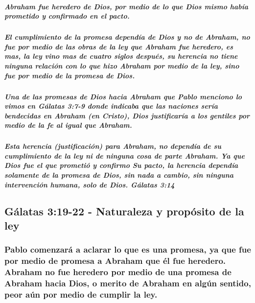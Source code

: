 \documentclass[11a pt,twoside]{article}
\let\oldsubsection\subsection
\renewcommand{\subsection}{\needspace{5\baselineskip}\oldsubsection}
\let\oldsubsubsection\subsubsection
\renewcommand{\subsubsection}{\needspace{4\baselineskip}\oldsubsubsection}
\let\oldsubparagraph\subparagraph
\renewcommand{\subparagraph}{\needspace{2\baselineskip}\oldsubparagraph}
\begin{document}
\subparagraph{Abraham fue heredero de Dios, por medio de lo que Dios
mismo había prometido y confirmado en el
pacto.}\label{abraham-fue-heredero-de-dios-por-medio-de-lo-que-dios-mismo-habuxeda-prometido-y-confirmado-en-el-pacto.}

\subparagraph{El cumplimiento de la promesa dependía de Dios y no de
Abraham, no fue por medio de las obras de la ley que Abraham fue
heredero, es mas, la ley vino mas de cuatro siglos después, su herencia
no tiene ninguna relación con lo que hizo Abraham por medio de la ley,
sino fue por medio de la promesa de
Dios.}\label{el-cumplimiento-de-la-promesa-dependuxeda-de-dios-y-no-de-abraham-no-fue-por-medio-de-las-obras-de-la-ley-que-abraham-fue-heredero-es-mas-la-ley-vino-mas-de-cuatro-siglos-despuuxe9s-su-herencia-no-tiene-ninguna-relaciuxf3n-con-lo-que-hizo-abraham-por-medio-de-la-ley-sino-fue-por-medio-de-la-promesa-de-dios.}

\subparagraph{Una de las promesas de Dios hacia Abraham que Pablo
menciono lo vimos en Gálatas 3:7-9 donde indicaba que las naciones sería
bendecidas en Abraham (en Cristo), Dios justificaría a los gentiles por
medio de la fe al igual que
Abraham.}\label{una-de-las-promesas-de-dios-hacia-abraham-que-pablo-menciono-lo-vimos-en-guxe1latas-37-9-donde-indicaba-que-las-naciones-seruxeda-bendecidas-en-abraham-en-cristo-dios-justificaruxeda-a-los-gentiles-por-medio-de-la-fe-al-igual-que-abraham.}

\subparagraph{Esta herencia (justificación) para Abraham, no dependía de
su cumplimiento de la ley ni de ninguna cosa de parte Abraham. Ya que
Dios fue el que prometió y confirmo Su pacto, la herencia dependía
solamente de la promesa de Dios, sin nada a cambio, sin ninguna
intervención humana, solo de Dios. Gálatas
3:14}\label{esta-herencia-justificaciuxf3n-para-abraham-no-dependuxeda-de-su-cumplimiento-de-la-ley-ni-de-ninguna-cosa-de-parte-abraham.-ya-que-dios-fue-el-que-prometiuxf3-y-confirmo-su-pacto-la-herencia-dependuxeda-solamente-de-la-promesa-de-dios-sin-nada-a-cambio-sin-ninguna-intervenciuxf3n-humana-solo-de-dios.-guxe1latas-314}

\subsection{Gálatas 3:19-22 - Naturaleza y propósito de la
ley}\label{guxe1latas-319-22---naturaleza-y-propuxf3sito-de-la-ley}

\subsubsection{Pablo comenzará a aclarar lo que es una promesa, ya que
fue por medio de promesa a Abraham que él fue heredero. Abraham no fue
heredero por medio de una promesa de Abraham hacia Dios, o merito de
Abraham en algún sentido, peor aún por medio de cumplir la
ley.}\label{pablo-comenzaruxe1-a-aclarar-lo-que-es-una-promesa-ya-que-fue-por-medio-de-promesa-a-abraham-que-uxe9l-fue-heredero.-abraham-no-fue-heredero-por-medio-de-una-promesa-de-abraham-hacia-dios-o-merito-de-abraham-en-alguxfan-sentido-peor-auxfan-por-medio-de-cumplir-la-ley.}
\end{document}
